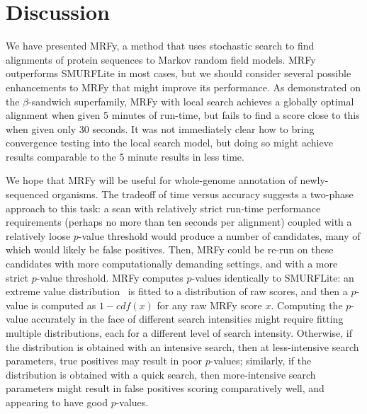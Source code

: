 \documentclass[blockstyle,times,preprint]{sigplanconf}
\begin{document}
\begin{small}
\end{small}




\section{Discussion}

We have presented MRFy, a method that uses stochastic search to find 
alignments of protein sequences to Markov random field models.
MRFy outperforms SMURFLite in most cases, but we should consider several 
possible enhancements to MRFy that might improve its performance.
As demonstrated on the $\beta$-sandwich superfamily, MRFy with local search 
achieves a globally optimal alignment when given 5 minutes of run-time, but 
fails to find a score close to this when given only 30 seconds.
It was not immediately clear how to bring convergence testing into the local
search model, but doing so might achieve results comparable to the 5 minute
results in less time.

We hope that MRFy will be useful for whole-genome annotation of newly-sequenced
organisms.
The tradeoff of time versus accuracy suggests a two-phase approach to this task:
a scan with relatively strict run-time performance requirements (perhaps no more
than ten seconds per alignment) coupled with a relatively loose $p$-value 
threshold would produce a number of candidates, many of which would likely be
false positives.
Then, MRFy could be re-run on these candidates with more computationally
demanding settings, and with a more strict $p$-value threshold.
MRFy computes $p$-values identically to SMURFLite: an extreme value 
distribution~\cite{Eddy:1998ut} is fitted to a distribution of raw scores,
and then a $p$-value is computed as $1-cdf\left( x \right)$ for any raw MRFy 
score $x$.
Computing the $p$-value accurately in the face of different search intensities
might require fitting multiple distributions, each for a different level of
search intensity.
Otherwise, if the distribution is obtained with an intensive search, then at
less-intensive search parameters, true positives may result in poor $p$-values;
similarly, if the distribution is obtained with a quick search, then 
more-intensive search parameters might result in false positives scoring 
comparatively well, and appearing to have good $p$-values.
\end{document}
